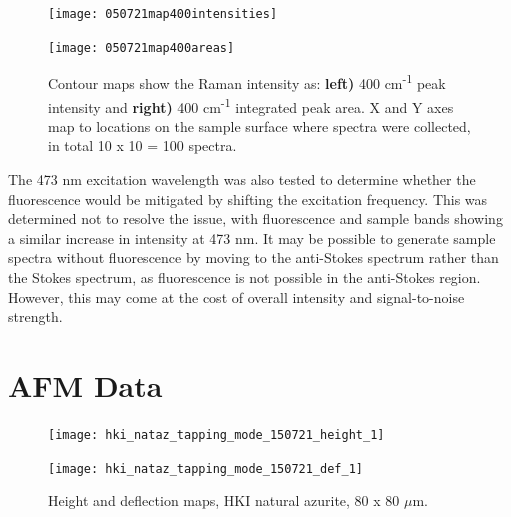 \begin{figure}[H]
\centering
\begin{minipage}{.45\textwidth}
  \centering
  \texttt{[image: 050721map400intensities]}
\end{minipage}
\begin{minipage}{.45\textwidth}
  \centering
  \texttt{[image: 050721map400areas]}
\end{minipage}
\caption[Contour maps, azurite Raman intensity in historical cross section]{Contour maps show the Raman intensity as: \textbf{left)} 400 cm\textsuperscript{-1} peak intensity and \textbf{right)} 400 cm\textsuperscript{-1} integrated peak area. X and Y axes map to locations on the sample surface where spectra were collected, in total 10 x 10 = 100 spectra.}
\label{fig:contours_xsection}
\end{figure}

The 473 nm excitation wavelength was also tested to determine whether the fluorescence would be mitigated by shifting the excitation frequency. This was determined not to resolve the issue, with fluorescence and sample bands showing a similar increase in intensity at 473 nm. It may be possible to generate sample spectra without fluorescence by moving to the anti-Stokes spectrum rather than the Stokes spectrum, as fluorescence is not possible in the anti-Stokes region. However, this may come at the cost of overall intensity and signal-to-noise strength.





\section[AFM Data]{AFM Data}
\label{section3.4}


\begin{figure}[H]
\centering
\begin{minipage}{.45\textwidth}
  \centering
  \texttt{[image: hki\_nataz\_tapping\_mode\_150721\_height\_1]}
\end{minipage}
\begin{minipage}{.45\textwidth}
  \centering
  \texttt{[image: hki\_nataz\_tapping\_mode\_150721\_def\_1]}
\end{minipage}
\caption[Height and deflection maps, HKI natural azurite]{Height and deflection maps, HKI natural azurite, 80 x 80 $\mu$m.}
\label{fig:afm_hki_nataz_height_def_1}
\end{figure}

